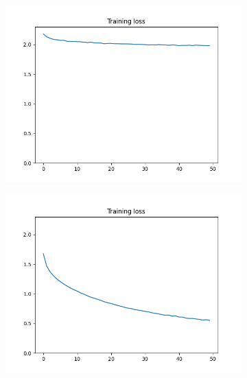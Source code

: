 \documentclass[12pt]{article}
\begin{document}
\begin{figure}
  \begin{subfigure}{0.16\textwidth}
    \centering
    \includegraphics[width=\linewidth]{loss_2_1.png}
    \caption{}
    \label{fig:2_1}
  \end{subfigure}
  \begin{subfigure}{0.16\textwidth}
    \centering
    \includegraphics[width=\linewidth]{loss_2_2.png}
    \caption{}
    \label{fig:2_2}
  \end{subfigure}
  \begin{subfigure}{0.16\textwidth}
    \centering

\end{subfigure}
\end{figure}
\end{document}
